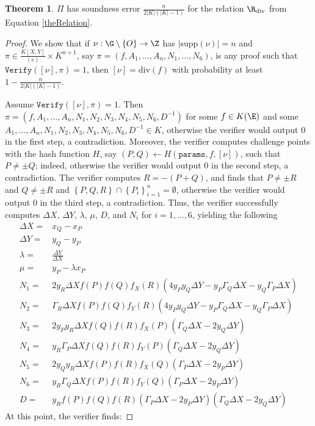 \documentclass[11pt,letterpaper]{article}
\newcommand{\free}[1]{{\textcolor{red}{#1}}}
\theoremstyle{definition}
\newtheorem{theorem}{Theorem}[subsection]
\newcommand{\6}{\mathbf}
\newcommand{\7}{\mathcal}
\newcommand{\non}{2 y_R \Delta X f(P)f(Q)f_X(R)(4 y_P y_Q  \Delta Y - y_P  \Gamma_Q \Delta X  - y_Q  \Gamma_P \Delta X )}
\newcommand{\ntw}{\Gamma_R \Delta X f(P)f(Q)f_Y(R)(4 y_P y_Q \Delta Y - y_P \Gamma_Q \Delta X  - y_Q \Gamma_P \Delta X )}
\newcommand{\nth}{2 y_P y_R \Delta X f(Q)f(R)f_X(P)(\Gamma_Q \Delta X - 2 y_Q \Delta Y)}
\newcommand{\nfo}{y_R \Gamma_P \Delta X f(Q)f(R)f_Y(P)(\Gamma_Q \Delta X  - 2  y_Q \Delta Y)}
\newcommand{\nfi}{2 y_Q y_R \Delta X  f(P)f(R)f_X(Q)(\Gamma_P \Delta X - 2 y_P \Delta Y) }
\newcommand{\nsi}{y_R \Gamma_Q \Delta X f(P)f(R)f_Y(Q)(\Gamma_P  \Delta X - 2  y_P \Delta Y) }
\newcommand{\den}{y_R f(P)f(Q)f(R)(\Gamma_P\Delta X - 2 y_P \Delta Y)(\Gamma_Q\Delta X - 2 y_Q \Delta Y)}
\begin{document}
\begin{theorem}\label{thm:DivisorSoundness}
$\Pi$ has
soundness error $\frac{n}{2\left|K\right|\left(\left|K\right|-1\right)}$ for the relation $\R_{\text{div}}$ from Equation \ref{theRelation}.
\end{theorem}
\begin{proof}
We show that if $\nu: \G\setminus\left\{O\right\} \to \Z$ has $\left|\text{supp}(\nu)\right| = n$ and $\pi \in \frac{K[X,Y]}{(e)} \times K^{n+1}$, say $\pi=(f, A_1, \ldots, A_n, N_1, \ldots, N_6)$, is any proof such that $\texttt{Verify}([\nu], \pi) = 1$, then $[\nu] = \text{div}(f)$ with probability at least $1 - \frac{n}{2\left|K\right|(\left|K\right|-1)}$.

Assume $\texttt{Verify}([\nu], \pi) = 1$. Then $\pi = (f,  A_1, \ldots, A_n, N_1, N_2, N_3, N_4, N_5, N_6, D^{-1})$ for some $f \in K(\E)$ and some $A_1, \ldots, A_n, N_1, N_2, N_3, N_4, N_5, N_6, D^{-1} \in K$, otherwise the verifier would output $0$ in the first step, a contradiction. Moreover, the verifier computes challenge points with the hash function $H$, say $(P, Q) \leftarrow H(\texttt{params}, f, [\nu])$, such that $P \neq \pm Q$; indeed, otherwise the verifier would output $0$ in the second step, a contradiction.  The verifier computes $R = -(P + Q)$, and finds that $P \neq \pm R$ and $Q \neq \pm R$ and $\left\{P, Q, R\right\} \cap \left\{P_i\right\}_{i=1}^{n} = \emptyset$, otherwise the verifier would output $0$ in the third step, a contradiction. Thus, the verifier successfully computes $\Delta X$, $\Delta Y$, $\lambda$, $\mu$, $D$, and $N_i$ for $i=1, \dots, 6$, yielding the following 
\begin{align*}
\Delta X =& x_Q - x_P \\
\Delta Y =& y_Q - y_P \\
\lambda =& \frac{\Delta Y}{\Delta X} \\
\mu =& y_P - \lambda x_P \\
N_1 =& \non \\
N_2 =& \ntw \\
N_3 =& \nth \\
N_4 =& \nfo \\
N_5 =& \nfi \\
N_6 =& \nsi \\
D =& \den 
\end{align*}
At this point, the verifier finds:
\renewcommand\labelitemi{--}

\end{proof}
\end{document}

